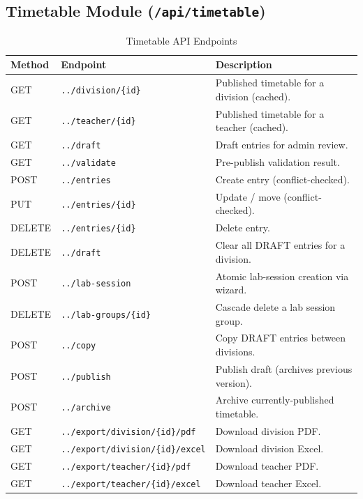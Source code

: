 \subsection{Timetable Module (\texttt{/api/timetable})}
\begin{table}[H]
    \centering
    \renewcommand{\arraystretch}{1.4}
    \begin{tabular}{|p{1.8cm}|p{5.3cm}|p{6.5cm}|}
        \hline
        \textbf{Method} & \textbf{Endpoint} & \textbf{Description} \\
        \hline
        GET & \texttt{../division/\{id\}} & Published timetable for a division (cached). \\
        \hline
        GET & \texttt{../teacher/\{id\}} & Published timetable for a teacher (cached). \\
        \hline
        GET & \texttt{../draft} & Draft entries for admin review. \\
        \hline
        GET & \texttt{../validate} & Pre-publish validation result. \\
        \hline
        POST & \texttt{../entries} & Create entry (conflict-checked). \\
        \hline
        PUT & \texttt{../entries/\{id\}} & Update / move (conflict-checked). \\
        \hline
        DELETE & \texttt{../entries/\{id\}} & Delete entry. \\
        \hline
        DELETE & \texttt{../draft} & Clear all DRAFT entries for a division. \\
        \hline
        POST & \texttt{../lab-session} & Atomic lab-session creation via wizard. \\
        \hline
        DELETE & \texttt{../lab-groups/\{id\}} & Cascade delete a lab session group. \\
        \hline
        POST & \texttt{../copy} & Copy DRAFT entries between divisions. \\
        \hline
        POST & \texttt{../publish} & Publish draft (archives previous version). \\
        \hline
        POST & \texttt{../archive} & Archive currently-published timetable. \\
        \hline
        GET & \texttt{../export/division/\{id\}/pdf} & Download division PDF. \\
        \hline
        GET & \texttt{../export/division/\{id\}/excel} & Download division Excel. \\
        \hline
        GET & \texttt{../export/teacher/\{id\}/pdf} & Download teacher PDF. \\
        \hline
        GET & \texttt{../export/teacher/\{id\}/excel} & Download teacher Excel. \\
        \hline
    \end{tabular}
    \caption{Timetable API Endpoints}
    \label{tab:api_timetable}
\end{table}

